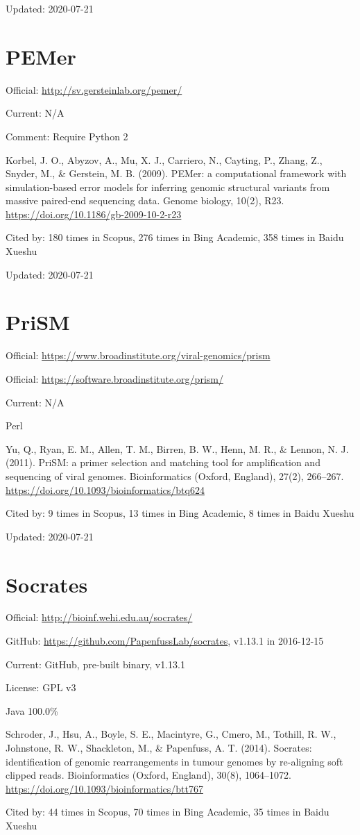 \documentclass[]{article}
\newcommand{\cb}[3]{\par Cited by: {\color{blue}\Huge #1} times in Scopus, {\color{blue}\Huge #2} times in Bing Academic, {\color{blue}\Huge #3} times in Baidu Xueshu}
\begin{document}
Updated: 2020-07-21

\section{PEMer}

Official: \url{http://sv.gersteinlab.org/pemer/}

Current: N/A

Comment: Require Python 2

Korbel, J. O., Abyzov, A., Mu, X. J., Carriero, N., Cayting, P., Zhang, Z., Snyder, M., \& Gerstein, M. B. (2009). PEMer: a computational framework with simulation-based error models for inferring genomic structural variants from massive paired-end sequencing data. Genome biology, 10(2), R23. \url{https://doi.org/10.1186/gb-2009-10-2-r23}\cb{180}{276}{358}

Updated: 2020-07-21

\section{PriSM}

Official: \url{https://www.broadinstitute.org/viral-genomics/prism}

Official: \url{https://software.broadinstitute.org/prism/}

Current: N/A

Perl

Yu, Q., Ryan, E. M., Allen, T. M., Birren, B. W., Henn, M. R., \& Lennon, N. J. (2011). PriSM: a primer selection and matching tool for amplification and sequencing of viral genomes. Bioinformatics (Oxford, England), 27(2), 266–267. \url{https://doi.org/10.1093/bioinformatics/btq624}\cb{9}{13}{8}

Updated: 2020-07-21

\section{Socrates}

Official: \url{http://bioinf.wehi.edu.au/socrates/}

GitHub: \url{https://github.com/PapenfussLab/socrates}, v1.13.1 in 2016-12-15

Current: GitHub, pre-built binary, v1.13.1

License: GPL v3

Java 100.0\%

Schroder, J., Hsu, A., Boyle, S. E., Macintyre, G., Cmero, M., Tothill, R. W., Johnstone, R. W., Shackleton, M., \& Papenfuss, A. T. (2014). Socrates: identification of genomic rearrangements in tumour genomes by re-aligning soft clipped reads. Bioinformatics (Oxford, England), 30(8), 1064–1072. \url{https://doi.org/10.1093/bioinformatics/btt767}\cb{44}{70}{35}
\end{document}
